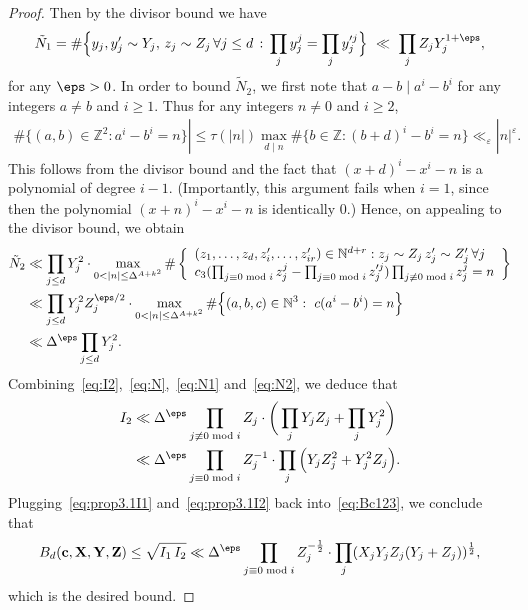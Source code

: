 \begin{proof}
  Then by the divisor bound we have
  \begin{align}\label{eq:N1}
  \tilde{N}_1= \#\Big\{ y_j, y_j'\sim Y_j,\,z_j \sim Z_j\,\forall j\leq d\,:\, \prod_{j}y_j^j=\prod_{j}y_j'^j\Big\} \ \ll \ \prod_j Z_j Y_j^{1+\eps},
  \end{align}
  for any $\eps>0$. In order to bound $\tilde{N}_2$, we first note that $a-b\mid a^i-b^i$ for any integers $a\neq b$ and $i\geq 1$. Thus for any integers $n\neq 0$ and $i\geq 2$,
  \begin{align*}
  \#\{(a,b)\in \mathbb{Z}^2:a^i-b^i=n\}|\leq \tau(|n|)\max_{d\mid n}\#\{b\in \mathbb{Z}:(b+d)^i-b^i=n\}\ll_{\varepsilon} |n|^{\varepsilon}.
  \end{align*}
  This follows from the divisor bound and the fact that $(x+d)^i-x^i-n$ is a polynomial of degree $i-1$. (Importantly, this argument fails when $i=1$, since then the polynomial $(x+n)^i-x^i-n$ is identically $0$.)
  Hence, on appealing to the divisor bound, we obtain
  \begin{align}\label{eq:N2}\begin{split}
  \tilde{N}_2&\ll \prod_{j\leq d}Y_j^2\cdot \max_{0<|n|\leq \Delta^{A+k^2}}\#\left\{
  \begin{array}{l}
  (z_1,\ldots,z_d,z_i',\ldots, z_{ir}')\in \mathbb{N}^{d+r}:
  z_j \sim Z_j\,z_j' \sim Z_j'\, \forall j\\
  c_3(\prod_{j\equiv 0\bmod i}z_j^j-\prod_{j\equiv 0\bmod i}z_j'^j)\prod_{j\not \equiv 0\bmod i}z_{j}^j=n
  \end{array}\right\}\\
  &\ll \prod_{j\leq d}Y_j^2Z_j^{\eps/2}\cdot \max_{0<|n|\leq \Delta^{A+k^2}}\#\Big\{(a,b,c)\in \mathbb{N}^{3}:\,\, c(a^i-b^i)=n \Big\}\\
  &\ll \Delta^\eps\prod_{j\leq d}Y_j^{2}.
  \end{split}
  \end{align}
  Combining~\eqref{eq:I2},~\eqref{eq:N},~\eqref{eq:N1} and~\eqref{eq:N2}, we deduce that
  \begin{equation}
  \begin{split}
  \label{eq:prop3.1I2}
  I_2 &\ll \Delta^\eps \prod_{j\not \equiv 0\bmod i}Z_{j} \cdot\bigg(\prod_j Y_j Z_j + \prod_{j}
  Y_j^2 \bigg) \\
  &\ll \Delta^\eps \prod_{j\equiv 0\bmod i}Z_j^{-1}\cdot \prod_{j}\Big(Y_j Z_j^{2} + Y_j^2Z_j\Big).
  \end{split}\end{equation}
  Plugging~\eqref{eq:prop3.1I1} and~\eqref{eq:prop3.1I2} back into~\eqref{eq:Bc123}, we conclude that
  \begin{align*}
  B_d(\mathbf{c},\mathbf{X},\mathbf{Y},\mathbf{Z}) \leq \sqrt{I_1\,I_2}\ll \Delta^\eps \prod_{j\equiv 0\bmod i}Z_j^{-\frac{1}{2}}\cdot \prod_{j}(X_j Y_j Z_j(Y_j+Z_j))^{\frac{1}{2}},
  \end{align*}
  which is the desired bound.
\end{proof}


